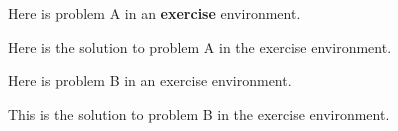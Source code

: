 \begin{exercise}
Here is problem A in an \textbf{exercise} environment.
	\begin{solution}[]
	Here is the solution to problem A in the exercise environment.
	\end{solution}
\end{exercise}


\begin{exercise}
Here is problem B in an exercise environment.
	\begin{solution}[]
	This is the solution to problem B in the exercise environment.
	\end{solution}
\end{exercise}

